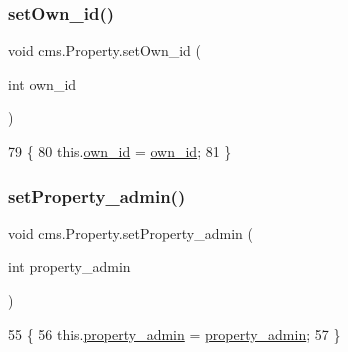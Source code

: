 \subsubsection{\texorpdfstring{set\+Own\+\_\+id()}{setOwn\_id()}}
{\footnotesize\ttfamily void cms.\+Property.\+set\+Own\+\_\+id (\begin{DoxyParamCaption}\item[{int}]{own\+\_\+id }\end{DoxyParamCaption})\hspace{0.3cm}{\ttfamily [inline]}}


\begin{DoxyCode}
79                                       \{
80         this.\mbox{\hyperlink{classcms_1_1_property_aa764bfa22c7dcc85bfdbc152dcf1a9f7}{own\_id}} = \mbox{\hyperlink{classcms_1_1_property_aa764bfa22c7dcc85bfdbc152dcf1a9f7}{own\_id}};
81     \}
\end{DoxyCode}
\mbox{\label{classcms_1_1_property_ad3fc9f749278cc0592f8d0f4b82af1d2}} 
\subsubsection{\texorpdfstring{set\+Property\+\_\+admin()}{setProperty\_admin()}}
{\footnotesize\ttfamily void cms.\+Property.\+set\+Property\+\_\+admin (\begin{DoxyParamCaption}\item[{int}]{property\+\_\+admin }\end{DoxyParamCaption})\hspace{0.3cm}{\ttfamily [inline]}}


\begin{DoxyCode}
55                                                       \{
56         this.\mbox{\hyperlink{classcms_1_1_property_a24082a4e64c157c5ef3b9238f58dba4c}{property\_admin}} = \mbox{\hyperlink{classcms_1_1_property_a24082a4e64c157c5ef3b9238f58dba4c}{property\_admin}};
57     \}
\end{DoxyCode}
\mbox{\label{classcms_1_1_property_aa8ff81bc406f23695423cfd7aa0aa78f}} 

